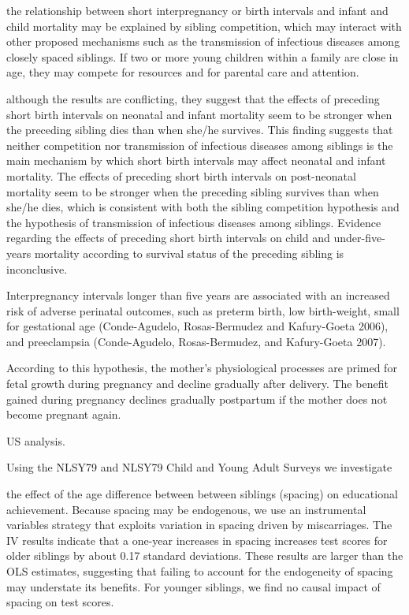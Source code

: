 the relationship between short interpregnancy or birth intervals and
infant and child mortality may be explained by sibling competition,
which may interact with other proposed mechanisms such as the
transmission of infectious diseases among closely spaced siblings. If
two or more young children within a family are close in age, they may
compete for resources and for parental care and attention.

although the results are conflicting, they suggest that the effects of
preceding short birth intervals on neonatal and infant mortality seem to
be stronger when the preceding sibling dies than when she/he survives.
This finding suggests that neither competition nor transmission of
infectious diseases among siblings is the main mechanism by which short
birth intervals may affect neonatal and infant mortality. The effects of
preceding short birth intervals on post-neonatal mortality seem to be
stronger when the preceding sibling survives than when she/he dies,
which is consistent with both the sibling competition hypothesis and the
hypothesis of transmission of infectious diseases among siblings.
Evidence regarding the effects of preceding short birth intervals on
child and under-five-years mortality according to survival status of the
preceding sibling is inconclusive.

Interpregnancy intervals longer than five years are associated with an
increased risk of adverse perinatal outcomes, such as preterm birth, low
birth-weight, small for gestational age (Conde-Agudelo, Rosas-Bermudez
and Kafury-Goeta 2006), and preeclampsia (Conde-Agudelo, Rosas-Bermudez,
and Kafury-Goeta 2007).

According to this hypothesis, the mother’s physiological processes are
primed for fetal growth during pregnancy and decline gradually after
delivery. The benefit gained during pregnancy declines gradually
postpartum if the mother does not become pregnant again.

\citet{Buckles2012}

US analysis.

Using the NLSY79 and NLSY79 Child and Young Adult Surveys we investigate

the effect of the age difference between between siblings (spacing) on
educational achievement. Because spacing may be endogenous, we use an
instrumental variables strategy that exploits variation in spacing
driven
by miscarriages. The IV results indicate that a one-year increases in
spacing increases test scores for older siblings by about 0.17 standard
deviations. These results are larger than the OLS estimates, suggesting
that failing to account for the endogeneity of spacing may understate
its benefits. For younger siblings, we find no causal impact of spacing
on test scores.

